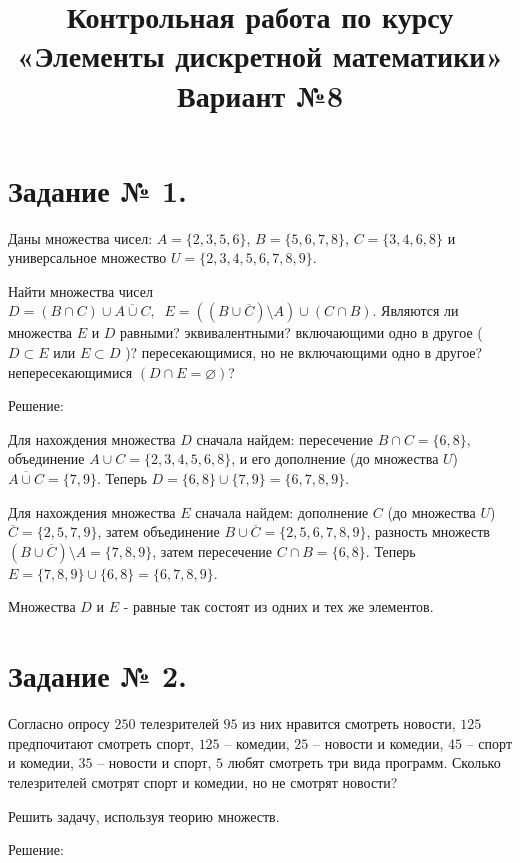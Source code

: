 \documentclass[fleqn]{article}
\title{Контрольная работа по курсу «Элементы дискретной математики»\\
Вариант №8}
\begin{document}
\date{}
\maketitle
\section*{Задание № 1.}

Даны множества чисел: $A=\{2,3,5,6\}$, $B=\{5,6,7,8\}$, $C=\{3,4,6,8\}$ и универсальное множество $U=\{2,3,4,5,6,7,8,9\}$.

Найти множества чисел $D=(B\cap C)\cup \overline{A\cup C},\;\; E=((B\cup \overline{C})\setminus A)\cup(C\cap B)$. Являются ли множества $E$ и $D$ равными? эквивалентными? включающими одно в другое ( $D \subset E$ или $E \subset D$ )? пересекающимися, но не включающими одно в другое? непересекающимися $(D\cap E=\varnothing)$?

\begin{center}Решение:\end{center}

Для нахождения множества $D$ сначала найдем: пересечение $B\cap C=\{6,8\}$, объединение $A\cup C=\{2,3,4,5,6,8\}$, и его дополнение (до множества $U$) $\overline{A\cup C}=\{7,9\}$. Теперь $D=\{6,8\}\cup\{7,9\}=\{6,7,8,9\}$.

Для нахождения множества $E$ сначала найдем: дополнение $C$ (до множества $U$) $\overline{C}=\{2,5,7,9\}$, затем объединение $B\cup \overline{C}=\{2,5,6,7,8,9\}$, разность множеств $(B\cup \overline{C})\setminus A=\{7,8,9\}$, затем пересечение $C\cap B=\{6,8\}$. Теперь $E=\{7,8,9\}\cup\{6,8\}=\{6,7,8,9\}$.

Множества $D$ и $E$ - равные так состоят из одних и тех же элементов.

\section*{Задание № 2.}

Согласно опросу $250$ телезрителей $95$ из них нравится смотреть новости, $125$ предпочитают смотреть спорт, $125$ – комедии, $25$ – новости и комедии, $45$ – спорт и комедии, $35$ – новости и спорт, $5$ любят смотреть три вида программ. Сколько телезрителей смотрят спорт и комедии, но не смотрят новости?

Решить задачу, используя теорию множеств.

\begin{center}Решение:\end{center}
\end{document}
